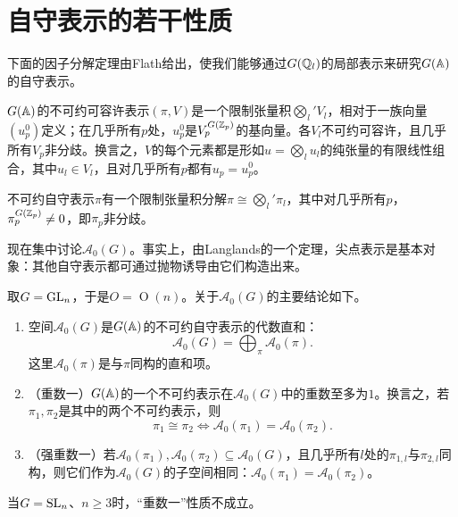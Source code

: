 \section{自守表示的若干性质}\label{L5S2}
下面的因子分解定理由Flath给出，使我们能够通过$G(\mathbb{Q}_l)$的局部表示来研究$G(\mathbb{A})$的自守表示。
\begin{theorem}\label{L5S2O1}
$G(\mathbb{A})$的不可约可容许表示$(\pi,V)$是一个限制张量积$\bigotimes_l'V_l$，相对于一族向量$(u_p^0)$定义；在几乎所有$p$处，$u_p^0$是$V_p^{G(\mathbb{Z}_p)}$的基向量。各$V_l$不可约可容许，且几乎所有$V_p$非分歧。换言之，$V$的每个元素都是形如$u=\bigotimes_lu_l$的纯张量的有限线性组合，其中$u_l\in V_l$，且对几乎所有$p$都有$u_p=u_p^0$。
\end{theorem}
\begin{corollary}\label{L5S2O2}
不可约自守表示$\pi$有一个限制张量积分解$\pi\cong\bigotimes_l'\pi_l$，其中对几乎所有$p$，$\pi_p^{G(\mathbb{Z}_p)}\ne0$，即$\pi_p$非分歧。
\end{corollary}
现在集中讨论$\mathcal A_0(G)$。事实上，由Langlands的一个定理，尖点表示是基本对象：其他自守表示都可通过抛物诱导由它们构造出来。

取$G=\operatorname{GL}_n$，于是$O=\operatorname O(n)$。关于$\mathcal A_0(G)$的主要结论如下。
\begin{theorem}\label{L5S2O3}
\begin{enumerate}[label=(\roman*)]
\item 空间$\mathcal A_0(G)$是$G(\mathbb{A})$的不可约自守表示的代数直和：
\[\mathcal A_0(G)=\bigoplus_\pi\mathcal A_0(\pi).\]
这里$\mathcal A_0(\pi)$是与$\pi$同构的直和项。
\item （重数一）$G(\mathbb{A})$的一个不可约表示在$\mathcal A_0(G)$中的重数至多为$1$。换言之，若$\pi_1,\pi_2$是其中的两个不可约表示，则
\[\pi_1\cong\pi_2\iff\mathcal A_0(\pi_1)=\mathcal A_0(\pi_2).\]
\item （强重数一）若$\mathcal A_0(\pi_1),\mathcal A_0(\pi_2)\subseteq\mathcal A_0(G)$，且几乎所有$l$处的$\pi_{1,l}$与$\pi_{2,l}$同构，则它们作为$\mathcal A_0(G)$的子空间相同：$\mathcal A_0(\pi_1)=\mathcal A_0(\pi_2)$。
\end{enumerate}
\end{theorem}
\begin{note}[L5S2O4]
当$G=\operatorname{SL}_n$、$n\geq3$时，“重数一”性质不成立。
\end{note}

